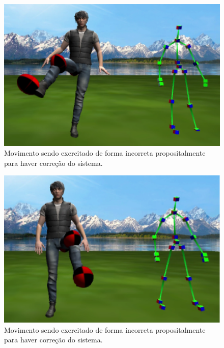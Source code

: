   \begin{figure}[H]
  \centering
  \includegraphics [keepaspectratio=true,scale=0.60]{figuras/pernaDireitaErrada.eps}
  \caption{Movimento sendo exercitado de forma incorreta propositalmente para haver correção do sistema.}
  \label{img:pernaDireitaErrada}
  \end{figure}

  \begin{figure}[H]
  \centering
  \includegraphics [keepaspectratio=true,scale=0.60]{figuras/pernaEsquerdaErrada.eps}
  \caption{Movimento sendo exercitado de forma incorreta propositalmente para haver correção do sistema.}
  \label{img:pernaEsquerdaErrada}
  \end{figure}


